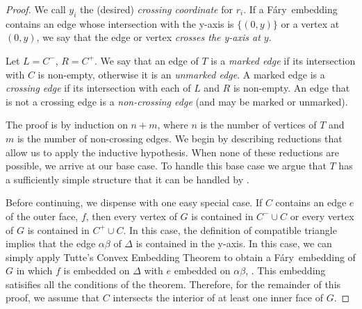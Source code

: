 \documentclass{patmorin}
\newcommand{\Fary}{Fáry}
\begin{document}
\begin{proof}
   We call $y_i$ the (desired) \emph{crossing coordinate} for $r_i$. If
   a \Fary\ embedding contains an edge whose intersection with the
   y-axis is $\{(0,y)\}$ or a vertex at $(0,y)$, we say that the edge
   or vertex \emph{crosses the y-axis at $y$}.

   Let $L=C^-$, $R=C^+$.  We say that an edge of $T$ is a \emph{marked
   edge} if its intersection with $C$ is non-empty, otherwise it is
   an \emph{unmarked edge}.  A marked edge is a \emph{crossing edge}
   if its intersection with each of $L$ and $R$ is non-empty.  An edge
   that is not a crossing edge is a \emph{non-crossing edge} (and may
   be marked or unmarked). 


%

   The proof is by induction on $n+m$, where $n$ is the number of vertices
   of $T$ and $m$ is the number of non-crossing edges.
   We begin by describing reductions that allow us to apply the inductive
   hypothesis. When none of these reductions are possible, we arrive
   at our base case. To handle this base case we argue that $T$ has a
   sufficiently simple structure that it can be handled by .

   Before continuing, we dispense with one easy special case.  If $C$
   contains an edge $e$ of the outer face, $f$, then every vertex
   of $G$ is contained in $C^-\cup C$ or every vertex of $G$ is contained
   in $C^+\cup C$.  In this case, the definition of compatible triangle
   implies that the edge $\alpha\beta$ of $\Delta$ is contained in the
   y-axis.  In this case, we can simply apply Tutte's Convex Embedding
   Theorem to obtain a \Fary\ embedding of $G$ in which $f$ is embedded
   on $\Delta$ with $e$ embedded on $\alpha\beta$, .  This embedding
   satisifies all the conditions of the theorem.  Therefore, for the
   remainder of this proof, we assume that $C$ intersects the interior
   of at least one inner face of $G$.


\end{proof}
\end{document}
